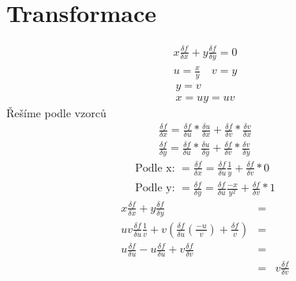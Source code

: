 \documentclass{article}
\begin{document}
\section{Transformace}
\begin{eqnarray*}
x\frac{\delta f}{\delta x}+y\frac{\delta f}{\delta y}=0
\end{eqnarray*}
\begin{eqnarray*}
u=\frac{x}{y}\quad v=y
\end{eqnarray*}
\begin{eqnarray*}
y=v\\
x=uy=uv
\end{eqnarray*}
Řešíme podle vzorců
\begin{eqnarray*}
\frac{\delta f}{\delta x}=\frac{\delta f}{\delta u}*\frac{\delta u}{\delta x}+\frac{\delta f}{\delta v}*\frac{\delta v}{\delta x}\\
\frac{\delta f}{\delta y}=\frac{\delta f}{\delta u}*\frac{\delta u}{\delta y}+\frac{\delta f}{\delta v}*\frac{\delta v}{\delta y}
\end{eqnarray*}
\begin{eqnarray*}
\text{Podle x: }=\frac{\delta f}{\delta x}=\frac{\delta f}{\delta u}\frac{1}{y}+\frac{\delta f}{\delta v}*0\\
\text{Podle y: }=\frac{\delta f}{\delta y}=\frac{\delta f}{\delta u}\frac{-x}{y^2}+\frac{\delta f}{\delta v}*1
\end{eqnarray*}
\begin{eqnarray*}
x\frac{\delta f}{\delta x}+y\frac{\delta f}{\delta y}&=&\\
uv\frac{\delta f}{\delta u}\frac{1}{v}+v\left( \frac{\delta f}{\delta u}\left( \frac{-u}{v}\right)+\frac{\delta f}{v} \right)&=&\\
u\frac{\delta f}{\delta u}-u\frac{\delta f}{\delta u}+v\frac{\delta f}{\delta v}&=&\\
&=&v\frac{\delta f}{\delta v}
\end{eqnarray*}
\end{document}
